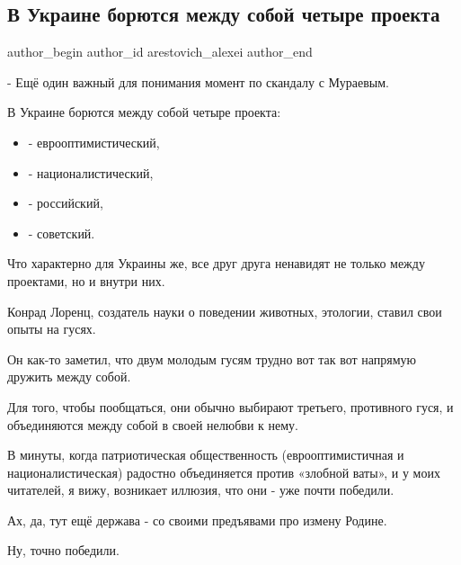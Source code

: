  
 
 
 
 
 
\subsection{В Украине борются между собой четыре проекта}
\label{sec:10_06_2018.fb.arestovich_alexei.1.chetyre_projekta}
\ifcmt
	author_begin
   author_id arestovich_alexei
	author_end
\fi

- Ещё один важный для понимания момент по скандалу с Мураевым.

В Украине борются между собой четыре проекта:

\begin{itemize}
  \item - еврооптимистический,
  \item - националистический,
  \item - российский,
  \item - советский.
\end{itemize}

Что характерно для Украины же, все друг друга ненавидят не только между проектами, но и внутри них.

Конрад Лоренц, создатель науки о поведении животных, этологии, ставил свои опыты на гусях.

Он как-то заметил, что двум молодым гусям трудно вот так вот напрямую дружить между собой.

Для того, чтобы пообщаться, они обычно выбирают третьего, противного гуся, и
объединяются между собой в своей нелюбви к нему.

В минуты, когда патриотическая общественность (еврооптимистичная и
националистическая) радостно объединяется против «злобной ваты», и у моих
читателей, я вижу, возникает иллюзия, что они - уже почти победили.

Ах, да, тут ещё держава - со своими предъявами про измену Родине.

Ну, точно победили.

